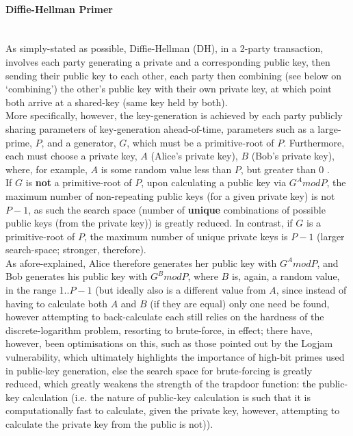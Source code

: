 \paragraph{Diffie-Hellman Primer}
\label{para:diffie-hellman_primer}
\noindent\\
As simply-stated as possible, Diffie-Hellman (DH), in a 2-party transaction, involves each party generating a private and a corresponding public key, then sending their public key to each other, each party then combining (see below on `combining') the other's public key with their own private key, at which point both arrive at a shared-key (same key held by both).\\
More specifically, however, the key-generation is achieved by each party publicly sharing parameters of key-generation ahead-of-time, parameters such as a large-prime, $P$, and a generator, $G$, which must be a primitive-root of $P$. Furthermore, each must choose a private key, $A$ (Alice's private key), $B$ (Bob's private key), where, for example, $A$ is some random value less than $P$, but greater than 0 \citep{geeks:dh}.\\
If $G$ is \textbf{not} a primitive-root of $P$, upon calculating a public key via $G^A mod P$, the maximum number of non-repeating public keys (for a given private key) is not $P-1$, as such the search space (number of \textbf{unique} combinations of possible public keys (from the private key)) is greatly reduced. In contrast, if $G$ is a primitive-root of $P$, the maximum number of unique private keys is $P-1$ (larger search-space; stronger, therefore).\\
As afore-explained, Alice therefore generates her public key with $G^A mod P$, and Bob generates his public key with $G^B mod P$, where $B$ is, again, a random value, in the range 1..$P-1$ (but ideally also is a different value from $A$, since instead of having to calculate both $A$ and $B$ (if they are equal) only one need be found, however attempting to back-calculate each still relies on the hardness of the discrete-logarithm problem, resorting to brute-force, in effect; there have, however, been optimisations on this, such as those pointed out by the Logjam vulnerability, which ultimately highlights the importance of high-bit primes used in public-key generation, else the search space for brute-forcing is greatly reduced, which greatly weakens the strength of the trapdoor function: the public-key calculation (i.e. the nature of public-key calculation is such that it is computationally fast to calculate, given the private key, however, attempting to calculate the private key from the public is not)).\\
